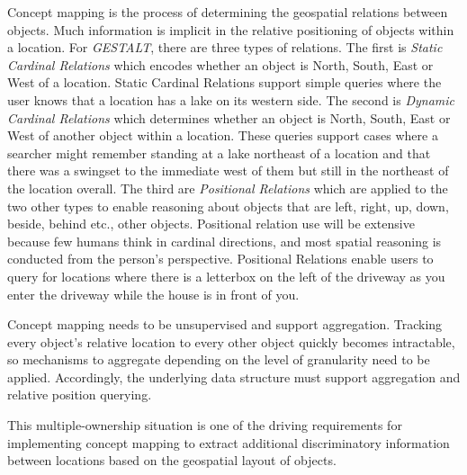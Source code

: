 Concept mapping is the process of determining the geospatial relations between objects. Much information is implicit in the relative positioning of objects within a location. For \textit{GESTALT}, there are three types of relations. 
The first is \textit{Static Cardinal Relations} which encodes whether an object is North, South, East or West of a location. Static Cardinal Relations support simple queries where the user knows that a location has a lake on its western side. 
The second is \textit{Dynamic Cardinal Relations} which determines whether an object is North, South, East or West of another object within a location. These queries support cases where a searcher might remember standing at a lake northeast of a location and that there was a swingset to the immediate west of them but still in the northeast of the location overall. 
The third are \textit{Positional Relations} which are applied to the two other types to enable reasoning about objects that are left, right, up, down, beside, behind etc., other objects. 
Positional relation use will be extensive because few humans think in cardinal directions, and most spatial reasoning is conducted from the person's perspective. 
Positional Relations enable users to query for locations where there is a letterbox on the left of the driveway as you enter the driveway while the house is in front of you. 

Concept mapping needs to be unsupervised and support aggregation. Tracking every object's relative location to every other object quickly becomes intractable, so mechanisms to aggregate depending on the level of granularity need to be applied. 
Accordingly, the underlying data structure must support aggregation and relative position querying. 


This multiple-ownership situation is one of the driving requirements for implementing concept mapping to extract additional discriminatory information between locations based on the geospatial layout of objects.